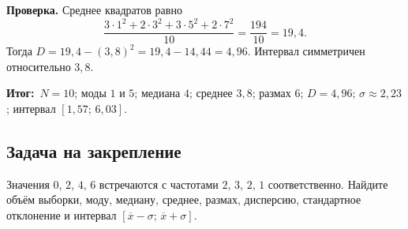 \documentclass[a4paper,12pt]{article}
\newcommand{\res}{\textcolor{accent}{\textbf{Итог:}}}
\begin{document}
\textbf{Проверка.} Среднее квадратов равно
\[
\frac{3\cdot1^2+2\cdot3^2+3\cdot5^2+2\cdot7^2}{10}
=\frac{194}{10}=19{,}4.
\]
Тогда $D=19{,}4-(3{,}8)^2=19{,}4-14{,}44=4{,}96$. Интервал симметричен относительно $3{,}8$.

\res\ $N=10$; моды $1$ и $5$; медиана $4$; среднее $3{,}8$; размах $6$; $D=4{,}96$; $\sigma\approx2{,}23$; интервал $[1{,}57;\,6{,}03]$.

\subsection*{Задача на закрепление}
Значения $0$, $2$, $4$, $6$ встречаются с частотами $2$, $3$, $2$, $1$ соответственно. Найдите объём выборки, моду, медиану, среднее, размах, дисперсию, стандартное отклонение и интервал $[\overline{x}-\sigma;\,\overline{x}+\sigma]$.
\end{document}
